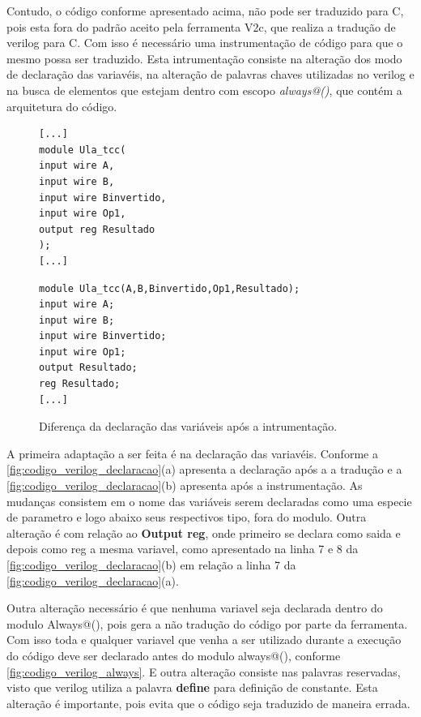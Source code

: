 \par
Contudo, o código conforme apresentado acima, não pode ser traduzido para C, pois esta fora do padrão aceito pela ferramenta V2c, que realiza a tradução de verilog para C. Com isso é necessário uma instrumentação de código para que o mesmo possa ser traduzido. Esta intrumentação consiste na alteração dos modo de declaração das variavéis, na alteração de palavras chaves utilizadas no verilog e na busca de elementos que estejam dentro com escopo \textit{always@()}, que contém a arquitetura do código.

\begin{figure}[H]
\caption{\label{fig:codigo_verilog_declaracao} Diferença da declaração das variáveis após a intrumentação.}
	\begin{center}
    \begin{minipage}{0.7\textwidth}
    \begin{lstlisting}
[...]
module Ula_tcc(
input wire A,
input wire B,
input wire Binvertido,
input wire Op1,
output reg Resultado
);
[...]
    \end{lstlisting}
    \end{minipage}
    \begin{minipage}{0.7\textwidth}
    \begin{lstlisting}
module Ula_tcc(A,B,Binvertido,Op1,Resultado);
input wire A;
input wire B;
input wire Binvertido;
input wire Op1;
output Resultado;
reg Resultado;
[...]
    \end{lstlisting}
    \end{minipage}
	\end{center}
\end{figure}

\par
A primeira adaptação a ser feita é na declaração das variavéis. Conforme a \autoref{fig:codigo_verilog_declaracao}(a) apresenta a declaração após a a tradução e a \autoref{fig:codigo_verilog_declaracao}(b) apresenta após a instrumentação. As mudanças consistem em o nome das variáveis serem declaradas como uma especie de parametro e logo abaixo seus respectivos tipo, fora do modulo. Outra alteração é com relação ao \textbf{Output reg}, onde primeiro se declara como saida e depois como reg a mesma variavel, como apresentado na linha 7 e 8 da \autoref{fig:codigo_verilog_declaracao}(b) em relação a linha 7 da \autoref{fig:codigo_verilog_declaracao}(a).

\par
Outra alteração necessário é que nenhuma variavel seja declarada dentro do modulo Always@(), pois gera a não tradução do código por parte da ferramenta. Com isso toda e qualquer variavel que venha a ser utilizado durante a execução do código deve ser declarado antes do modulo always@(), conforme \autoref{fig:codigo_verilog_always}. E outra alteração consiste nas palavras reservadas, visto que verilog utiliza a palavra \textbf{define} para definição de constante. Esta alteração é importante, pois evita que o código seja traduzido de maneira errada.

